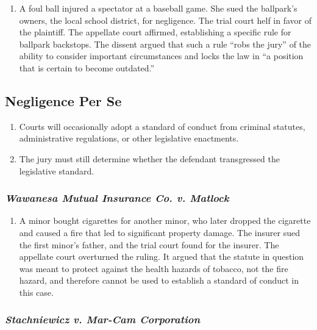 \begin{enumerate}
    \item A foul ball injured a spectator at a baseball game. She sued the ballpark's owners, the local school district, for negligence. The trial court helf in favor of the plaintiff. The appellate court affirmed, establishing a specific rule for ballpark backstops. The dissent argued that such a rule ``robs the jury'' of the ability to consider important circumstances and locks the law in ``a position that is certain to become outdated.''
\end{enumerate}

\subsection{Negligence Per Se}

\begin{enumerate}
    \item Courts will occasionally adopt a standard of conduct from criminal statutes, administrative regulations, or other legislative enactments.
    \item The jury must still determine whether the defendant transgressed the legislative standard.
\end{enumerate}

\subsubsection{\emph{Wawanesa Mutual Insurance Co. v. Matlock}}

\begin{enumerate}
    \item A minor bought cigarettes for another minor, who later dropped the cigarette and caused a fire that led to significant property damage. The insurer sued the first minor's father, and the trial court found for the insurer. The appellate court overturned the ruling. It argued that the statute in question was meant to protect against the health hazards of tobacco, not the fire hazard, and therefore cannot be used to establish a standard of conduct in this case.
\end{enumerate}

\subsubsection{\emph{Stachniewicz v. Mar-Cam Corporation}}

